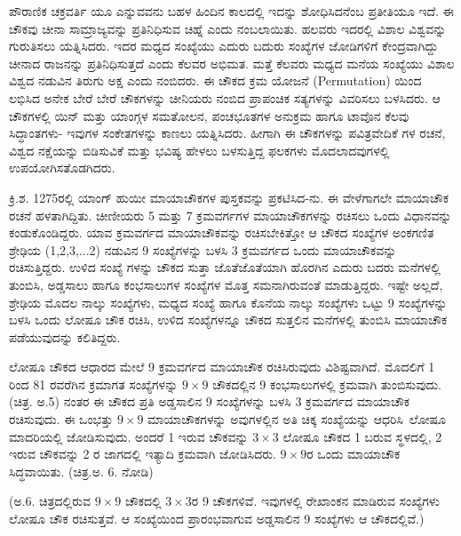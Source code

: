 ಪೌರಾಣಿಕ ಚಕ್ರವರ್ತಿ ಯೂ ಎನ್ನುವವನು ಬಹಳ ಹಿಂದಿನ ಕಾಲದಲ್ಲಿ ಇದನ್ನು ಶೋಧಿಸಿದನೆಂಬ ಪ್ರತೀತಿಯೂ ಇದೆ. ಈ ಚೌಕವು ಚೀನಾ ಸಾಮ್ರಾಜ್ಯವನ್ನು ಪ್ರತಿನಿಧಿಸುವ ಚಿಹ್ನೆ ಎಂದು ನಂಬಲಾಯಿತು. ಹಲವರು ಇದರಲ್ಲಿ ವಿಶಾಲ ವಿಶ್ವವನ್ನು ಗುರುತಿಸಲು ಯತ್ನಿಸಿದರು. ಇದರ ಮಧ್ಯದ ಸಂಖ್ಯೆಯು ಎದುರು ಬದುರು ಸಂಖ್ಯೆಗಳ ಜೋಡಿಗಳಿಗೆ ಕೇಂದ್ರವಾಗಿದ್ದು ಚೀನಾದ ರಾಜನನ್ನು ಪ್ರತಿನಿಧಿಸುತ್ತದೆ ಎಂದು ಕೆಲವರ ಅಭಿಮತ. ಮತ್ತೆ ಕೆಲವರು ಮಧ್ಯದ ಮನೆಯ ಸಂಖ್ಯೆಯು ವಿಶಾಲ ವಿಶ್ವದ ನಡುವಿನ ತಿರುಗು ಅಕ್ಷ ಎಂದು ನಂಬಿದರು. ಈ \linebreak ಚೌಕದ ಕ್ರಮ ಯೋಜನೆ (Permutation) ಯಿಂದ ಲಭಿಸಿದ ಅನೇಕ ಬೇರೆ ಬೇರೆ \linebreak ಚೌಕಗಳನ್ನು ಚೀನಿಯರು ನಂಬಿದ ಪ್ರಾಪಂಚಿಕ ಸತ್ಯಗಳನ್ನು ವಿವರಿಸಲು ಬಳಸಿದರು. ಆ ಚೌಕಗಳಲ್ಲಿ ಯಿನ್ ಮತ್ತು ಯಾಂಗ್ಗಳ ಸಮತೋಲನ, ಪಂಚಭೂತಗಳ ಅನುಕ್ರಮ ಹಾಗೂ ಟಾವೊನ ಕೆಲವು ಸಿದ್ಧಾಂತಗಳು- ಇವುಗಳ ಸಂಕೇತಗಳನ್ನು ಕಾಣಲು ಯತ್ನಿಸಿದರು. ಹೀಗಾಗಿ ಈ ಚೌಕಗಳನ್ನು ಪವಿತ್ರವೇದಿಕೆ ಗಳ ರಚನೆ, ವಿಶ್ವದ ನಕ್ಷೆಯನ್ನು ಬಿಡಿಸುವಿಕೆ ಮತ್ತು ಭವಿಷ್ಯ ಹೇಳಲು ಬಳಸುತ್ತಿದ್ದ ಫಲಕಗಳು ಮೊದಲಾದವುಗಳಲ್ಲಿ ಉಪಯೋಗಿಸತೊಡಗಿದರು.

ಕ್ರಿ.ಶ. 1275ರಲ್ಲಿ ಯಾಂಗ್ ಹುಯೀ ಮಾಯಾಚೌಕಗಳ ಪುಸ್ತಕವನ್ನು ಪ್ರಕಟಿಸಿದ-ನು. ಈ ವೇಳೆಗಾಗಲೇ ಮಾಯಾಚೌಕ ರಚನೆ ಹಳತಾಗಿದ್ದಿತು. ಚೀಣೀಯರು 5 ಮತ್ತು 7 ಕ್ರಮ\-ವರ್ಗಗಳ ಮಾಯಾಚೌಕಗಳನ್ನು ರಚಿಸಲು ಒಂದು ವಿಧಾನವನ್ನು ಕಂಡುಕೊಂಡಿದ್ದರು. ಯಾವ ಕ್ರಮವರ್ಗದ ಮಾಯಾಚೌಕವನ್ನು ರಚಿಸಬೇಕಿತ್ತೋ ಆ ಚೌಕದ ಸಂಖ್ಯೆಗಳ ಅಂಕಗಣಿತ ಶ್ರೇಢಿ\-ಯ (1,2,3,...2) ನಡುವಿನ 9 ಸಂಖ್ಯೆಗಳನ್ನು ಬಳಸಿ 3 ಕ್ರಮವರ್ಗದ ಒಂದು ಮಾಯಾಚೌಕ\-ವನ್ನು ರಚಿಸುತ್ತಿದ್ದರು. ಉಳಿದ ಸಂಖ್ಯೆ ಗಳನ್ನು ಚೌಕದ ಸುತ್ತಾ ಜೊತೆಜೊತೆಯಾಗಿ ಹೊರಗಿನ ಎದುರು ಬದರು ಮನೆಗಳಲ್ಲಿ ತುಂಬಿಸಿ, ಅಡ್ಡಸಾಲು ಹಾಗೂ ಕಂಭಸಾಲುಗಳ ಸಂಖ್ಯೆಗಳ ಮೊತ್ತ ಸಮನಾಗಿರುವಂತೆ ಮಾಡುತ್ತಿದ್ದರು. ಇಷ್ಟೇ ಅಲ್ಲದೆ, ಶ್ರೇಢಿಯ ಮೊದಲ ನಾಲ್ಕು ಸಂಖ್ಯೆಗಳು, ಮಧ್ಯದ ಸಂಖ್ಯೆ ಹಾಗೂ ಕೊನೆಯ ನಾಲ್ಕು ಸಂಖ್ಯೆಗಳು ಒಟ್ಟು 9 ಸಂಖ್ಯೆಗಳನ್ನು ಬಳಸಿ \linebreak ಒಂದು ಲೋಷೂ ಚೌಕ ರಚಿಸಿ, ಉಳಿದ ಸಂಖ್ಯೆಗಳನ್ನೂ ಚೌಕದ ಸುತ್ತಲಿನ ಮನೆಗಳಲ್ಲಿ ತುಂಬಿಸಿ ಮಾಯಾಚೌಕ ಪಡೆಯುವುದನ್ನು ಕಲಿತಿದ್ದರು.

ಲೋಷೂ ಚೌಕದ ಆಧಾರದ ಮೇಲೆ 9 ಕ್ರಮವರ್ಗದ ಮಾಯಾಚೌಕ ರಚಿಸಿರುವುದು \hbox{ವಿಶಿಷ್ಟವಾಗಿದೆ.} ಮೊದಲಿಗೆ 1 ರಿಂದ 81 ರವರೆಗಿನ ಕ್ರಮಾಗತ ಸಂಖ್ಯೆಗಳನ್ನು $9 \times 9$ ಚೌಕ\-ದಲ್ಲಿನ 9 ಕಂಭಸಾಲುಗಳಲ್ಲಿ ಕ್ರಮವಾಗಿ ತುಂಬಿಸುವುದು. (ಚಿತ್ರ. ಅ.5) ನಂತರ ಈ ಚೌಕದ ಪ್ರತಿ ಅಡ್ಡಸಾಲಿನ 9 ಸಂಖ್ಯೆಗಳನ್ನು ಬಳಸಿ 3 ಕ್ರಮವರ್ಗದ ಮಾಯಾಚೌಕ ರಚಿಸುವುದು. ಈ ಒಂಭ\-ತ್ತು $9 \times 9$ ಮಾಯಾಚೌಕಗಳನ್ನು ಅವುಗಳಲ್ಲಿನ ಅತಿ ಚಿಕ್ಕ ಸಂಖ್ಯೆಯನ್ನು \hbox{ಆಧರಿಸಿ ಲೋಷೂ} ಮಾದರಿಯಲ್ಲಿ ಜೋಡಿಸುವುದು. ಅಂದರೆ 1 ಇರುವ ಚೌಕವನ್ನು $3 \times 3$ ಲೋಷೂ ಚೌಕದ 1 ಬರುವ ಸ್ಥಳದಲ್ಲಿ, 2 ಇರುವ ಚೌಕವನ್ನು 2 ರ ಜಾಗದಲ್ಲಿ ಇತ್ಯಾದಿ ಕ್ರಮವಾಗಿ ಜೋಡಿಸಿದರು. $9 \times 9$ರ ಒಂದು ಮಾಯಾಚೌಕ ಸಿದ್ಧವಾಯಿತು. (ಚಿತ್ರ.ಅ. 6. ನೋಡಿ)

(ಅ.6. ಚಿತ್ರದಲ್ಲಿರುವ $9 \times 9$ ಚೌಕದಲ್ಲಿ $3 \times 3$ರ 9 ಚೌಕಗಳಿವೆ. ಇವುಗಳಲ್ಲಿ ರೇಖಾಂಕನ ಮಾಡಿರುವ ಸಂಖ್ಯೆಗಳು ಲೋಷೂ ಚೌಕ ರಚಿಸುತ್ತವೆ. ಆ ಸಂಖ್ಯೆಯಿಂದ ಪ್ರಾರಂಭವಾಗುವ ಅಡ್ಡಸಾಲಿನ 9 ಸಂಖ್ಯೆಗಳು ಆ ಚೌಕದಲ್ಲಿವೆ.)

